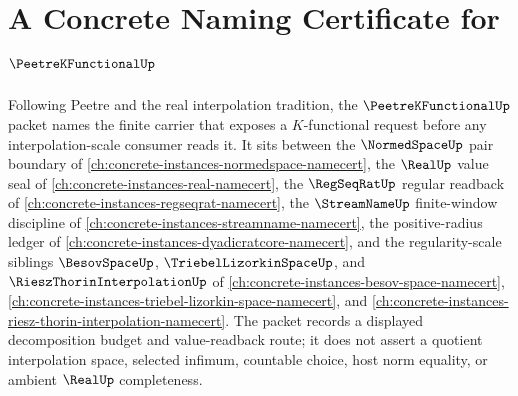 \chapter{A Concrete Naming Certificate for $\PeetreKFunctionalUp$}
\label{ch:concrete-instances-peetre-k-functional-namecert}

Following Peetre and the real interpolation tradition, the $\PeetreKFunctionalUp$ packet names the finite carrier that exposes a $K$-functional request before any interpolation-scale consumer reads it. It sits between the $\NormedSpaceUp$ pair boundary of \autoref{ch:concrete-instances-normedspace-namecert}, the $\RealUp$ value seal of \autoref{ch:concrete-instances-real-namecert}, the $\RegSeqRatUp$ regular readback of \autoref{ch:concrete-instances-regseqrat-namecert}, the $\StreamNameUp$ finite-window discipline of \autoref{ch:concrete-instances-streamname-namecert}, the positive-radius ledger of \autoref{ch:concrete-instances-dyadicratcore-namecert}, and the regularity-scale siblings $\BesovSpaceUp$, $\TriebelLizorkinSpaceUp$, and $\RieszThorinInterpolationUp$ of \autoref{ch:concrete-instances-besov-space-namecert}, \autoref{ch:concrete-instances-triebel-lizorkin-space-namecert}, and \autoref{ch:concrete-instances-riesz-thorin-interpolation-namecert}. The packet records a displayed decomposition budget and value-readback route; it does not assert a quotient interpolation space, selected infimum, countable choice, host norm equality, or ambient $\RealUp$ completeness.

